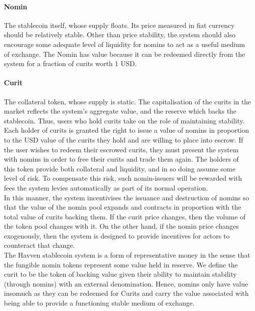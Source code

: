 \paragraph{Nomin} The stablecoin itself, whose supply floats. Its price measured in fiat currency should be relatively stable.
Other than price stability, the system should also encourage some adequate level of liquidity for nomins
to act as a useful medium of exchange. The Nomin has value because it can be redeemed directly from the system for a fraction of curits worth 1 USD.

\paragraph{Curit} The collateral token, whose supply is static.
The capitalisation of the curits in the market reflects the system's aggregate value, and the reserve
which backs the stablecoin. Thus, users who hold curits take on the role of maintaining stability. \\

\noindent Each holder of curits is granted the right to issue a value of nomins in proportion to the USD value
of the curits they hold and are willing to place into escrow. If the user wishes to redeem their escrowed curits, they must
present the system with nomins in order to free their curits and trade them again.
The holders of this token provide both collateral and liquidity, and in so doing assume some
level of risk. To compensate this risk, such nomin-issuers will be rewarded with fees the system levies
automatically as part of its normal operation. \\

\noindent In this manner, the system incentivises the issuance and destruction of nomins so that the value of
the nomin pool expands and contracts in proportion with the total value of curits backing them.
If the curit price changes, then the volume of the token pool changes with it.
On the other hand, if the nomin price changes exogenously, then the system is designed to provide
incentives for actors to counteract that change. \\

\noindent The Havven stablecoin system is a form of representative money in the sense that the fungible nomin
tokens represent some value held in reserve. We define the curit to be the token of backing value given their ability to maintain stability (through nomins) with an external denomination. Hence, nomins only have value insomuch as they can be redeemed for Curits and carry the value associated with being able to provide a functioning stable medium of exchange. \\

